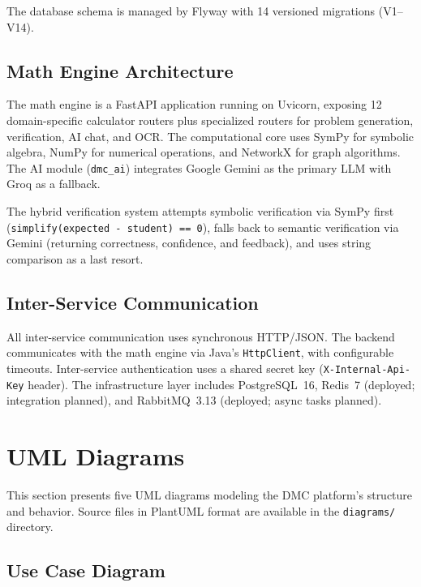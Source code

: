 The database schema is managed by Flyway with 14 versioned migrations (V1--V14).

\subsection{Math Engine Architecture}
\label{subsec:math-engine-arch}

The math engine is a FastAPI application running on Uvicorn, exposing 12 domain-specific calculator routers plus specialized routers for problem generation, verification, AI chat, and OCR. The computational core uses SymPy for symbolic algebra, NumPy for numerical operations, and NetworkX for graph algorithms. The AI module (\texttt{dmc\_ai}) integrates Google Gemini as the primary LLM with Groq as a fallback.

The hybrid verification system attempts symbolic verification via SymPy first (\texttt{simplify(expected - student) == 0}), falls back to semantic verification via Gemini (returning correctness, confidence, and feedback), and uses string comparison as a last resort.

\subsection{Inter-Service Communication}
\label{subsec:inter-service}

All inter-service communication uses synchronous HTTP/JSON. The backend communicates with the math engine via Java's \texttt{HttpClient}, with configurable timeouts. Inter-service authentication uses a shared secret key (\texttt{X-Internal-Api-Key} header). The infrastructure layer includes PostgreSQL~16, Redis~7 (deployed; integration planned), and RabbitMQ~3.13 (deployed; async tasks planned).


\section{UML Diagrams}
\label{sec:uml}

This section presents five UML diagrams modeling the DMC platform's structure and behavior. Source files in PlantUML format are available in the \texttt{diagrams/} directory.

\subsection{Use Case Diagram}
\label{subsec:use-case}

